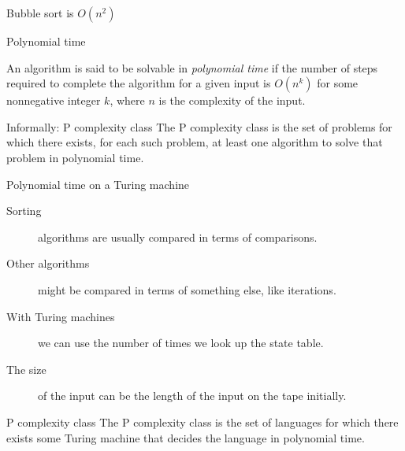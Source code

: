 \begin{frame}[fragile]{Bubble sort is $O(n^2)$}
\begin{center}
\end{center}
\end{frame}


\begin{frame}{Polynomial time}
  \begin{definition}
    An algorithm is said to be solvable in \emph{polynomial time} if the number of steps required to complete the algorithm for a given input is $O(n^k)$ for some nonnegative integer $k$, where $n$ is the complexity of the input.
  \end{definition}
  \vspace{4mm}
  \begin{alertblock}{Informally: P complexity class}
    The P complexity class is the set of problems for which there exists, for each such problem, at least one algorithm to solve that problem in polynomial time.
  \end{alertblock}
\end{frame}


\begin{frame}{Polynomial time on a Turing machine}
  \begin{description}
    \item[Sorting] algorithms are usually compared in terms of comparisons.
    \item[Other algorithms] might be compared in terms of something else, like iterations.
    \item[With Turing machines] we can use the number of times we look up the state table.
    \item[The size] of the input can be the length of the input on the tape initially.
  \end{description}
  \vspace{4mm}
  \begin{alertblock}{P complexity class}
    The P complexity class is the set of languages for which there exists some Turing machine that decides the language in polynomial time.
  \end{alertblock}
\end{frame}



